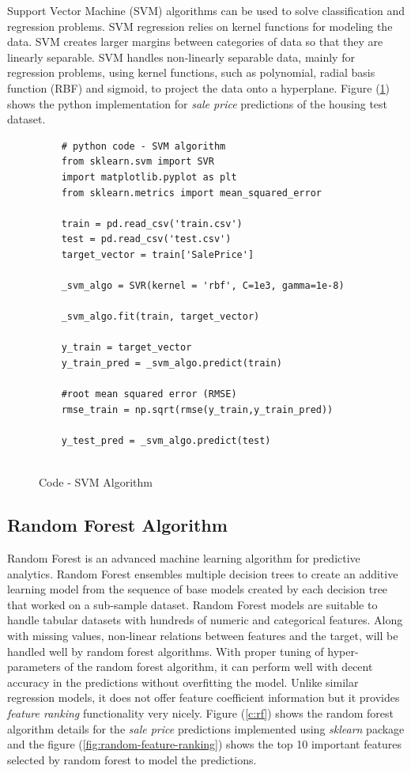 \documentclass[sigconf]{acmart}
\begin{document}
	Support Vector Machine (SVM) algorithms can be used to solve classification and regression problems. SVM regression relies on kernel functions for modeling the data. SVM creates larger margins between categories of data so that they are linearly separable. SVM handles non-linearly separable data, mainly for regression problems, using kernel functions, such as polynomial, radial basis function (RBF) and sigmoid, to project the data onto a hyperplane. Figure (\ref{c:svm}) shows the python implementation for {\em sale price} predictions of the housing test dataset.
	
	\begin{figure}[htb]	
	\begin{verbatim}	
	# python code - SVM algorithm
	from sklearn.svm import SVR
	import matplotlib.pyplot as plt
	from sklearn.metrics import mean_squared_error
	
	train = pd.read_csv('train.csv')
	test = pd.read_csv('test.csv')
	target_vector = train['SalePrice']
	
	_svm_algo = SVR(kernel = 'rbf', C=1e3, gamma=1e-8)	
	
	_svm_algo.fit(train, target_vector)    
		
	y_train = target_vector
	y_train_pred = _svm_algo.predict(train)
	
	#root mean squared error (RMSE)
	rmse_train = np.sqrt(rmse(y_train,y_train_pred))
	
	y_test_pred = _svm_algo.predict(test)
	
	\end{verbatim}
	\caption{Code - SVM Algorithm} \label{c:svm} 
	\end{figure}
	

	\subsection{Random Forest Algorithm}

    Random Forest is an advanced machine learning algorithm for predictive analytics. Random Forest ensembles multiple decision trees to create an additive learning model from the sequence of base models created by each decision tree that worked on a sub-sample dataset. Random Forest models are suitable to handle tabular datasets with hundreds of numeric and categorical features. Along with missing values, non-linear relations between features and the target, will be handled well by random forest algorithms. With proper tuning of hyper-parameters of the random forest algorithm, it can perform well with decent accuracy in the predictions without overfitting the model. Unlike similar regression models, it does not offer feature coefficient information but it provides {\em feature ranking} functionality very nicely. Figure (\ref{c:rf}) shows the random forest algorithm details for the {\em sale price} predictions implemented using {\em sklearn} package and the figure (\ref{fig:random-feature-ranking}) shows the top 10 important features selected by random forest to model the predictions.
	
\end{document}
